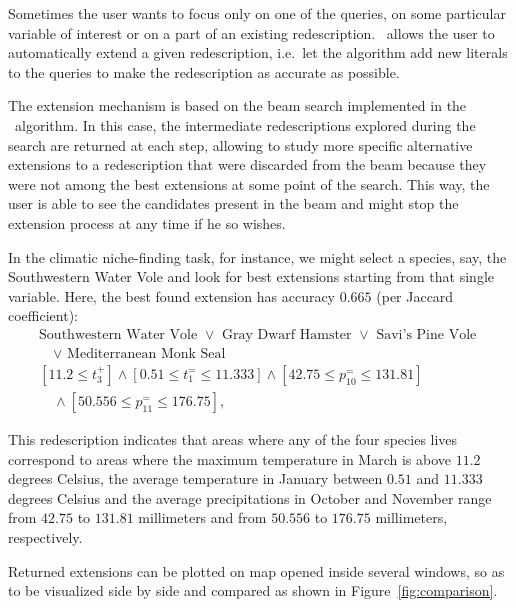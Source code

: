  Sometimes the user wants to focus only
on one of the queries, on some particular variable of interest or on a
part of an existing redescription.  \Siren\ allows the user to
automatically extend a given redescription, i.e.\ let the algorithm
add new literals to the queries to make the redescription as accurate
as possible.

The extension mechanism is based on the beam search
implemented in the \ReReMi\ algorithm. In this
case, the intermediate redescriptions explored during the search are
returned at each step, allowing to study more specific alternative
extensions to a redescription that were discarded from the beam
because they were not among the best extensions at some point of the
search.  This way, the user is able to see the candidates present in
the beam and might stop the extension process at any time if he so
wishes.

In the climatic niche-finding task, for instance, we might select a
species, say, the Southwestern Water Vole and look for best extensions
starting from that single variable. Here, the best found extension has
accuracy $0.665$ (per Jaccard coefficient):
\begin{equation*}
\begin{array}{l}
\text{Southwestern Water Vole }\lor\text{ Gray Dwarf Hamster }\lor\text{ Savi's Pine Vole }\\[1mm]
\quad\lor\text{ Mediterranean Monk Seal}\\[3mm]
[11.2 \leq t_{3}^{+}] \land  [0.51 \leq t_{1}^{=} \leq 11.333]\land  [42.75 \leq p_{10}^{=} \leq 131.81] \\[1mm]
\quad\land [50.556 \leq p_{11}^{=} \leq 176.75],
\end{array}
\end{equation*}

This redescription indicates that areas where any of the four species
lives correspond to areas where the maximum temperature in March is
above $11.2$ degrees Celsius, the average temperature in January
between $0.51$ and $11.333$ degrees Celsius and the average
precipitations in October and November range from $42.75$ to $131.81$
millimeters and from $50.556$ to $176.75$ millimeters, respectively.

Returned extensions can be plotted on map opened inside several
windows, so as to be visualized side by side and compared as shown in
Figure~\ref{fig:comparison}.

